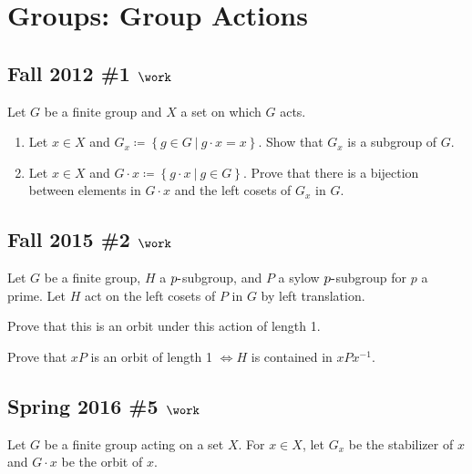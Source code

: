 \hypertarget{groups-group-actions}{%
\section{Groups: Group Actions}\label{groups-group-actions}}

\hypertarget{fall-2012-1-work}{%
\subsection{\texorpdfstring{Fall 2012 \#1
\(\work\)}{Fall 2012 \#1 \textbackslash work}}\label{fall-2012-1-work}}

Let \(G\) be a finite group and \(X\) a set on which \(G\) acts.

\begin{enumerate}
\def\labelenumi{\alph{enumi}.}
\item
  Let \(x\in X\) and
  \(G_x \coloneqq\left\{{g\in G {~\mathrel{\Big|}~}g\cdot x = x}\right\}\).
  Show that \(G_x\) is a subgroup of \(G\).
\item
  Let \(x\in X\) and
  \(G\cdot x \coloneqq\left\{{g\cdot x {~\mathrel{\Big|}~}g\in G}\right\}\).
  Prove that there is a bijection between elements in \(G\cdot x\) and
  the left cosets of \(G_x\) in \(G\).
\end{enumerate}

\hypertarget{fall-2015-2-work}{%
\subsection{\texorpdfstring{Fall 2015 \#2
\(\work\)}{Fall 2015 \#2 \textbackslash work}}\label{fall-2015-2-work}}

Let \(G\) be a finite group, \(H\) a \(p{\hbox{-}}\)subgroup, and \(P\)
a sylow \(p{\hbox{-}}\)subgroup for \(p\) a prime. Let \(H\) act on the
left cosets of \(P\) in \(G\) by left translation.

Prove that this is an orbit under this action of length 1.

Prove that \(xP\) is an orbit of length 1 \(\iff H\) is contained in
\(xPx^{-1}\).

\hypertarget{spring-2016-5-work}{%
\subsection{\texorpdfstring{Spring 2016 \#5
\(\work\)}{Spring 2016 \#5 \textbackslash work}}\label{spring-2016-5-work}}

Let \(G\) be a finite group acting on a set \(X\). For \(x\in X\), let
\(G_x\) be the stabilizer of \(x\) and \(G\cdot x\) be the orbit of
\(x\).

